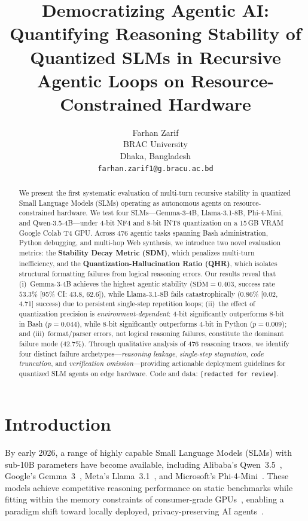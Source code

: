 \documentclass{article}
\title{Democratizing Agentic AI: Quantifying Reasoning Stability of Quantized SLMs in Recursive Agentic Loops on Resource-Constrained Hardware}
\author{%
  Farhan Zarif \\
  BRAC University \\
  Dhaka, Bangladesh \\
  \texttt{farhan.zarif1@g.bracu.ac.bd} \\
}
\begin{document}
\maketitle

\begin{abstract}
We present the first systematic evaluation of multi-turn recursive stability in quantized Small Language Models (SLMs) operating as autonomous agents on resource-constrained hardware. We test four SLMs---Gemma-3-4B, Llama-3.1-8B, Phi-4-Mini, and Qwen-3.5-4B---under 4-bit NF4 and 8-bit INT8 quantization on a 15\,GB VRAM Google Colab T4 GPU. Across 476 agentic tasks spanning Bash administration, Python debugging, and multi-hop Web synthesis, we introduce two novel evaluation metrics: the \textbf{Stability Decay Metric (SDM)}, which penalizes multi-turn inefficiency, and the \textbf{Quantization-Hallucination Ratio (QHR)}, which isolates structural formatting failures from logical reasoning errors. Our results reveal that (i)~Gemma-3-4B achieves the highest agentic stability ($\overline{\text{SDM}}=0.403$, success rate $53.3\%$ [95\% CI: 43.8, 62.6]), while Llama-3.1-8B fails catastrophically ($0.86\%$ [0.02, 4.71] success) due to persistent single-step repetition loops; (ii)~the effect of quantization precision is \emph{environment-dependent}: 4-bit significantly outperforms 8-bit in Bash ($p=0.044$), while 8-bit significantly outperforms 4-bit in Python ($p=0.009$); and (iii)~format/parser errors, not logical reasoning failures, constitute the dominant failure mode ($42.7\%$). Through qualitative analysis of 476 reasoning traces, we identify four distinct failure archetypes---\emph{reasoning leakage}, \emph{single-step stagnation}, \emph{code truncation}, and \emph{verification omission}---providing actionable deployment guidelines for quantized SLM agents on edge hardware. Code and data: \texttt{[redacted for review]}.
\end{abstract}

\section{Introduction}

By early 2026, a range of highly capable Small Language Models (SLMs) with sub-10B parameters have become available, including Alibaba's Qwen~3.5~\cite{bai2023qwen}, Google's Gemma~3~\cite{gemma2025}, Meta's Llama~3.1~\cite{touvron2023llama}, and Microsoft's Phi-4-Mini~\cite{phi4mini2025}. These models achieve competitive reasoning performance on static benchmarks while fitting within the memory constraints of consumer-grade GPUs~\cite{zhang2024tinyllama}, enabling a paradigm shift toward locally deployed, privacy-preserving AI agents~\cite{wang2024survey}.
\end{document}
